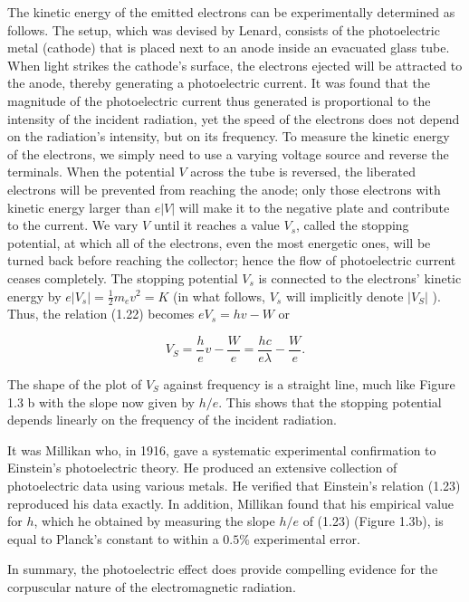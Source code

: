 \documentclass[10pt]{article}
\begin{document}
The kinetic energy of the emitted electrons can be experimentally determined as follows. The setup, which was devised by Lenard, consists of the photoelectric metal (cathode) that is placed next to an anode inside an evacuated glass tube. When light strikes the cathode's surface, the electrons ejected will be attracted to the anode, thereby generating a photoelectric current. It was found that the magnitude of the photoelectric current thus generated is proportional to the intensity of the incident radiation, yet the speed of the electrons does not depend on the radiation's intensity, but on its frequency. To measure the kinetic energy of the electrons, we simply need to use a varying voltage source and reverse the terminals. When the potential $V$ across the tube is reversed, the liberated electrons will be prevented from reaching the anode; only those electrons with kinetic energy larger than $e|V|$ will make it to the negative plate and contribute to the current. We vary $V$ until it reaches a value $V_{s}$, called the stopping potential, at which all of the electrons, even the most energetic ones, will be turned back before reaching the collector; hence the flow of photoelectric current ceases completely. The stopping potential $V_{s}$ is connected to the electrons' kinetic energy by $e\left|V_{s}\right|=\frac{1}{2} m_{e} v^{2}=K$ (in what follows, $V_{s}$ will implicitly denote $\left|V_{S}\right|$ ). Thus, the relation (1.22) becomes $e V_{s}=h v-W$ or


\begin{equation*}
V_{S}=\frac{h}{e} v-\frac{W}{e}=\frac{h c}{e \lambda}-\frac{W}{e} . \tag{1.23}
\end{equation*}


The shape of the plot of $V_{S}$ against frequency is a straight line, much like Figure 1.3 b with the slope now given by $h / e$. This shows that the stopping potential depends linearly on the frequency of the incident radiation.

It was Millikan who, in 1916, gave a systematic experimental confirmation to Einstein's photoelectric theory. He produced an extensive collection of photoelectric data using various metals. He verified that Einstein's relation (1.23) reproduced his data exactly. In addition, Millikan found that his empirical value for $h$, which he obtained by measuring the slope $h / e$ of (1.23) (Figure 1.3b), is equal to Planck's constant to within a $0.5 \%$ experimental error.

In summary, the photoelectric effect does provide compelling evidence for the corpuscular nature of the electromagnetic radiation.
\end{document}
